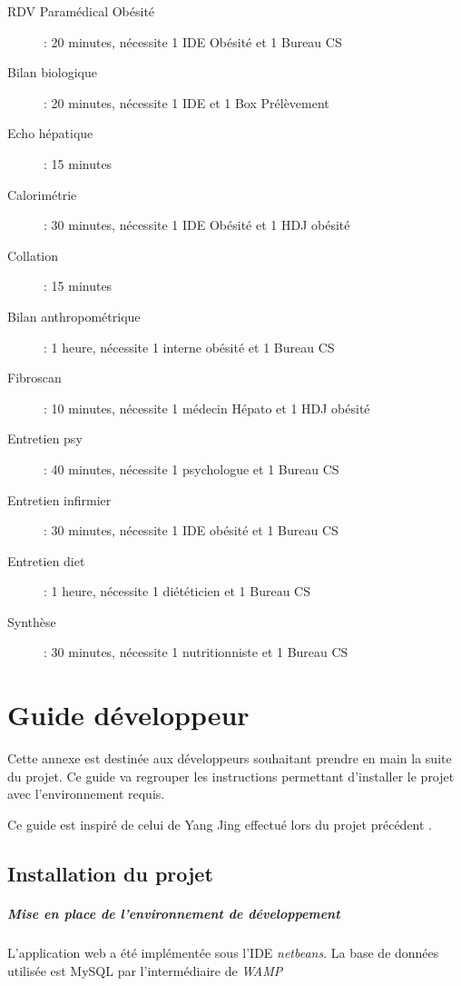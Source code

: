 \documentclass[noposter]{polytech/polytech}
\begin{document}
\begin{description}
	\item[RDV Paramédical Obésité]: 20 minutes, nécessite 1 IDE Obésité et 1 Bureau CS
	\item[Bilan biologique]: 20 minutes, nécessite 1 IDE et 1 Box Prélèvement
	\item[Echo hépatique]: 15 minutes
	\item[Calorimétrie]: 30 minutes, nécessite 1 IDE Obésité et 1 HDJ obésité
	\item[Collation]: 15 minutes
	\item[Bilan anthropométrique]: 1 heure, nécessite 1 interne obésité et 1 Bureau CS
	\item[Fibroscan]: 10 minutes, nécessite 1 médecin Hépato et 1 HDJ obésité	
	\item[Entretien psy]: 40 minutes, nécessite 1 psychologue et 1 Bureau CS
	\item[Entretien infirmier]: 30 minutes, nécessite 1 IDE obésité et 1 Bureau CS
	\item[Entretien diet]: 1 heure, nécessite 1 diététicien et 1 Bureau CS
	\item[Synthèse]: 30 minutes, nécessite 1 nutritionniste et 1 Bureau CS 
\end{description}

\chapter{Guide développeur}
\label{ann:guide}

Cette annexe est destinée aux développeurs souhaitant prendre en main la suite du projet. Ce guide va regrouper les instructions permettant d'installer le projet avec l'environnement requis. 

Ce guide est inspiré de celui de Yang Jing effectué lors du projet précédent \cite{yang_outil_nodate}.

\section{Installation du projet}


\paragraph{Mise en place de l’environnement de développement}

L'application web a été implémentée sous l'IDE \textit{netbeans}. La base de données utilisée est MySQL par l'intermédiaire de \textit{WAMP}
\end{document}
